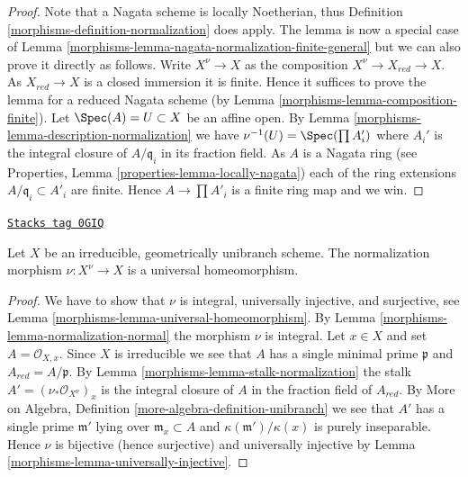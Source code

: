 \begin{proof}

Note that a Nagata scheme is locally Noetherian, thus
Definition \ref{morphisms-definition-normalization}
does apply. The lemma is now a special case of
Lemma \ref{morphisms-lemma-nagata-normalization-finite-general}
but we can also prove it directly as follows.
Write $X^\nu \to X$ as the composition
$X^\nu \to X_{red} \to X$. As $X_{red} \to X$ is a closed immersion
it is finite. Hence it suffices to prove the lemma for a reduced
Nagata scheme (by Lemma \ref{morphisms-lemma-composition-finite}).
Let $\Spec(A) = U \subset X$ be an affine open.
By Lemma \ref{morphisms-lemma-description-normalization} we have
$\nu^{-1}(U) = \Spec(\prod A_i')$ where $A_i'$ is the integral
closure of $A/\mathfrak q_i$ in its fraction field. As $A$ is a Nagata
ring (see Properties, Lemma \ref{properties-lemma-locally-nagata})
each of the ring extensions
$A/\mathfrak q_i \subset A'_i$ are finite. Hence $A \to \prod A'_i$
is a finite ring map and we win.
\end{proof}

\begin{lemma}
\label{morphisms-lemma-normalization-geom-unibranch-univ-homeo}
\href{https://stacks.math.columbia.edu/tag/0GIQ}{\texttt{Stacks tag 0GIQ}}

Let $X$ be an irreducible, geometrically unibranch scheme.
The normalization morphism $\nu : X^\nu \to X$ is a universal
homeomorphism.
\end{lemma}

\begin{proof}

We have to show that $\nu$ is integral, universally injective,
and surjective, see Lemma \ref{morphisms-lemma-universal-homeomorphism}.
By Lemma \ref{morphisms-lemma-normalization-normal} the morphism $\nu$
is integral. Let $x \in X$ and set $A = \mathcal{O}_{X, x}$.
Since $X$ is irreducible we see that $A$ has a single
minimal prime $\mathfrak p$ and $A_{red} = A/\mathfrak p$.
By Lemma \ref{morphisms-lemma-stalk-normalization} the stalk
$A' = (\nu_*\mathcal{O}_{X^\nu})_x$ is the integral closure of
$A$ in the fraction field of $A_{red}$. By
More on Algebra, Definition \ref{more-algebra-definition-unibranch}
we see that $A'$ has a single prime $\mathfrak m'$ lying
over $\mathfrak m_x \subset A$ and $\kappa(\mathfrak m')/\kappa(x)$
is purely inseparable. Hence $\nu$ is bijective (hence surjective)
and universally injective by Lemma \ref{morphisms-lemma-universally-injective}.
\end{proof}

